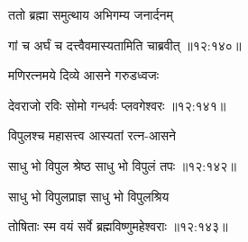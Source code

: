 {\devanagarifont ततो ब्रह्मा समुत्थाय अभिगम्य जनार्दनम् \thinspace{\dandab} \dontdisplaylinenum }%


{\devanagarifont गां च अर्घं च दत्त्वैवमास्यतामिति चाब्रवीत् {॥१२:१४०॥} \veg\dontdisplaylinenum }%

{\devanagarifont मणिरत्नमये दिव्ये आसने गरुडध्वजः \thinspace{\dandab} \dontdisplaylinenum }%
 

{\devanagarifont देवराजो रविः सोमो गन्धर्वः प्लवगेश्वरः {॥१२:१४१॥} \veg\dontdisplaylinenum }%

{\devanagarifont विपुलश्च महासत्त्व आस्यतां रत्न-आसने \thinspace{\dandab} \dontdisplaylinenum }%


{\devanagarifont साधु भो विपुल श्रेष्ठ साधु भो विपुलं तपः {॥१२:१४२॥} \veg\dontdisplaylinenum }%

{\devanagarifont साधु भो विपुलप्राज्ञ साधु भो विपुलश्रिय \thinspace{\dandab} \dontdisplaylinenum }%


{\devanagarifont तोषिताः स्म वयं सर्वे ब्रह्मविष्णुमहेश्वराः {॥१२:१४३॥} \veg\dontdisplaylinenum }%

